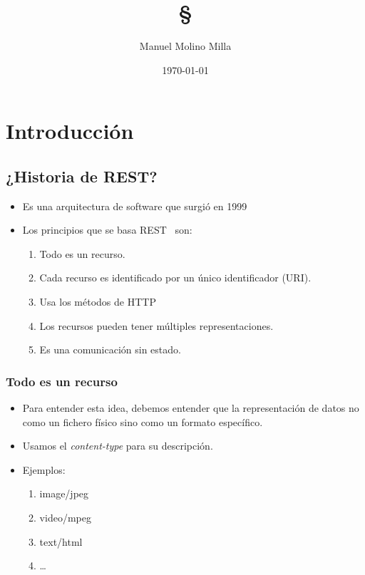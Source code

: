 \documentclass[4paper]{article}
\author{Manuel Molino Milla}
\title{\textbf{\S}}
\date{\today}
\newcommand{\R}{REST}
\begin{document}
\maketitle 
\tableofcontents
\newpage

\section{Introducción}
\subsection{¿Historia de  \R?}
\begin{itemize}
\item Es una arquitectura de software que surgió en 1999
\item Los principios que se basa \R ~ son:
\begin{enumerate}
\item Todo es un recurso.
\item Cada recurso es identificado por un único identificador (URI).
\item Usa los métodos de HTTP
\item Los recursos pueden tener múltiples representaciones.
\item Es una comunicación sin estado.
\end{enumerate}
\end{itemize}

\subsubsection{Todo es un recurso}
\begin{itemize}
\item Para entender esta idea, debemos entender que la representación de datos no como un fichero físico sino como un formato específico.
\item Usamos el \emph{content-type} para su descripción.
\item Ejemplos:
\begin{enumerate}
\item image/jpeg
\item video/mpeg
\item text/html
\item \dots
\end{enumerate}
\end{itemize}
\end{document}
